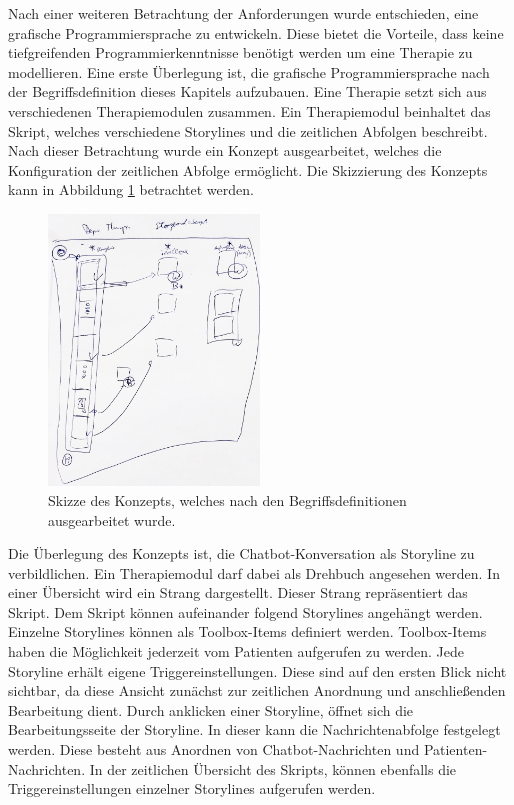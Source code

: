 Nach einer weiteren Betrachtung der Anforderungen wurde entschieden, eine grafische Programmiersprache zu entwickeln. Diese bietet die Vorteile, dass keine tiefgreifenden Programmierkenntnisse benötigt werden um eine Therapie zu modellieren. Eine erste Überlegung ist, die grafische Programmiersprache nach der Begriffsdefinition dieses Kapitels aufzubauen. Eine Therapie setzt sich aus verschiedenen Therapiemodulen zusammen. Ein Therapiemodul beinhaltet das Skript, welches verschiedene Storylines und die zeitlichen Abfolgen beschreibt. Nach dieser Betrachtung wurde ein Konzept ausgearbeitet, welches die Konfiguration der zeitlichen Abfolge ermöglicht. Die Skizzierung des Konzepts kann in Abbildung \ref{storylinekonz} betrachtet werden.

\begin{figure}[h]
\centering
\includegraphics[width=0.5\textwidth]{pictures/storylinekonz}
\caption{Skizze des Konzepts, welches nach den Begriffsdefinitionen ausgearbeitet wurde. }
\label{storylinekonz}
\end{figure}

Die Überlegung des Konzepts ist, die Chatbot-Konversation als Storyline zu verbildlichen. Ein Therapiemodul darf dabei als Drehbuch angesehen werden. In einer Übersicht wird ein Strang dargestellt. Dieser Strang repräsentiert das Skript. Dem Skript können aufeinander folgend Storylines angehängt werden. Einzelne Storylines können als Toolbox-Items definiert werden. Toolbox-Items haben die Möglichkeit jederzeit vom Patienten aufgerufen zu werden. Jede Storyline erhält eigene Triggereinstellungen. Diese sind auf den ersten Blick nicht sichtbar, da diese Ansicht zunächst zur zeitlichen Anordnung und anschließenden Bearbeitung dient. Durch anklicken einer Storyline, öffnet sich die Bearbeitungsseite der Storyline. In dieser kann die Nachrichtenabfolge festgelegt werden. Diese besteht aus Anordnen von Chatbot-Nachrichten und Patienten-Nachrichten. In der zeitlichen Übersicht des Skripts, können ebenfalls die Triggereinstellungen einzelner Storylines aufgerufen werden. 

